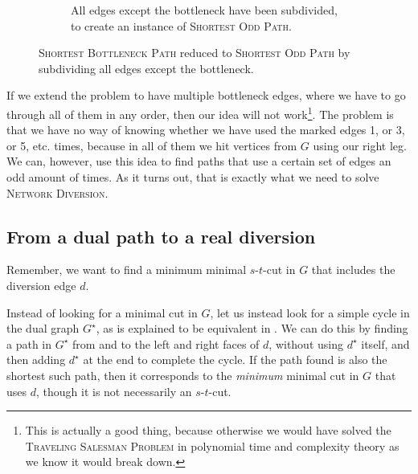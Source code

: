 \begin{figure}[H]
\begin{subfigure}{.45\textwidth}
{
        }
        \caption{All edges except the bottleneck have been subdivided, to create an instance of \textsc{Shortest Odd Path}.}
        \label{figure:subdivided-bottleneck}
    \end{subfigure}%
    \caption{\textsc{Shortest Bottleneck Path} reduced to \textsc{Shortest Odd Path} by subdividing all edges except the bottleneck.}
    \label{figure:bottleneck-subdividing}
\end{figure}

If we extend the problem to have multiple bottleneck edges, where we have to go through all of them in any order, then our idea will not work\footnote{This is actually a good thing, because otherwise we would have solved the \textsc{Traveling Salesman Problem} in polynomial time and complexity theory as we know it would break down.}.
The problem is that we have no way of knowing whether we have used the marked edges 1, or 3, or 5, etc. times, because in all of them we hit vertices from $G$ using our right leg. We can, however, use this idea to find paths that use a certain set of edges an odd amount of times. As it turns out, that is exactly what we need to solve \textsc{Network Diversion}.

\subsection{From a dual path to a real diversion}
Remember, we want to find a minimum minimal $s$-$t$-cut in $G$ that includes the diversion edge $d$.

Instead of looking for a minimal cut in $G$, let us instead look for a simple cycle in the dual graph $G^\star$, as is explained to be equivalent in . We can do this by finding a path in $G^\star$ from and to the left and right faces of $d$, without using $d^\star$ itself, and then adding $d^\star$ at the end to complete the cycle. If the path found is also the shortest such path, then it corresponds to the \emph{minimum} minimal cut in $G$ that uses $d$, though it is not necessarily an $s$-$t$-cut.

